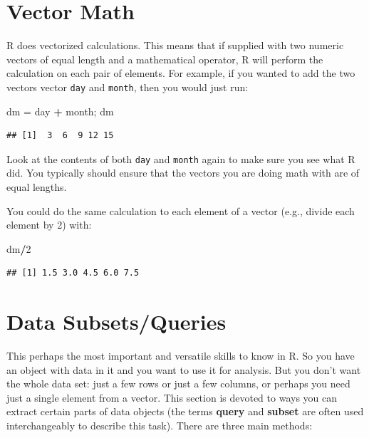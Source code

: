 \documentclass[]{book}
\newenvironment{Shaded}{\begin{snugshade}}{\end{snugshade}}
\newcommand{\DecValTok}[1]{\textcolor[rgb]{0.00,0.00,0.81}{#1}}
\newcommand{\StringTok}[1]{\textcolor[rgb]{0.31,0.60,0.02}{#1}}
\newcommand{\OperatorTok}[1]{\textcolor[rgb]{0.81,0.36,0.00}{\textbf{#1}}}
\newcommand{\NormalTok}[1]{#1}
\theoremstyle{definition}
\theoremstyle{definition}
\theoremstyle{definition}
\theoremstyle{remark}
\begin{document}
\section{Vector Math}\label{vector-math}

R does vectorized calculations. This means that if supplied with two
numeric vectors of equal length and a mathematical operator, R will
perform the calculation on each pair of elements. For example, if you
wanted to add the two vectors vector \texttt{day} and \texttt{month},
then you would just run:

\begin{Shaded}
\begin{Highlighting}[]
\NormalTok{dm =}\StringTok{ }\NormalTok{day }\OperatorTok{+}\StringTok{ }\NormalTok{month; dm}
\end{Highlighting}
\end{Shaded}

\begin{verbatim}
## [1]  3  6  9 12 15
\end{verbatim}

Look at the contents of both \texttt{day} and \texttt{month} again to
make sure you see what R did. You typically should ensure that the
vectors you are doing math with are of equal lengths.

You could do the same calculation to each element of a vector (e.g.,
divide each element by 2) with:

\begin{Shaded}
\begin{Highlighting}[]
\NormalTok{dm}\OperatorTok{/}\DecValTok{2}
\end{Highlighting}
\end{Shaded}

\begin{verbatim}
## [1] 1.5 3.0 4.5 6.0 7.5
\end{verbatim}

\section{Data Subsets/Queries}\label{sub}

This perhaps the most important and versatile skills to know in R. So
you have an object with data in it and you want to use it for analysis.
But you don't want the whole data set: just a few rows or just a few
columns, or perhaps you need just a single element from a vector. This
section is devoted to ways you can extract certain parts of data objects
(the terms \textbf{query} and \textbf{subset} are often used
interchangeably to describe this task). There are three main methods:
\end{document}
